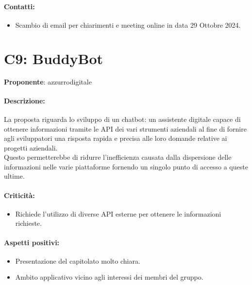 \documentclass{TWDocumentNoVersion}
\begin{document}
    \paragraph{Contatti:}
    \begin{itemize}
        \item Scambio di email per chiarimenti  e meeting online in data 29 Ottobre 2024.
    \end{itemize}

    \section*{C9: BuddyBot}
    {\textbf{Proponente}: azzurrodigitale}
    \paragraph{Descrizione:\\}
    {La proposta riguarda lo sviluppo di un chatbot: un assistente digitale capace di ottenere informazioni tramite le API dei vari strumenti aziendali al fine di fornire agli sviluppatori una risposta rapida e precisa alle loro domande relative ai progetti aziendali.\\Questo permetterebbe di ridurre l'inefficienza causata dalla dispersione delle informazioni nelle varie piattaforme fornendo un singolo punto di accesso a queste ultime.}
    \paragraph{Criticità:}
    \begin{itemize}
        \item Richiede l'utilizzo di diverse API esterne per ottenere le informazioni richieste.
    \end{itemize}
    \paragraph{Aspetti positivi:}
    \begin{itemize}
        \item Presentazione del capitolato molto chiara.
        \item Ambito applicativo vicino agli interessi dei membri del gruppo.
    \end{itemize}
\end{document}
